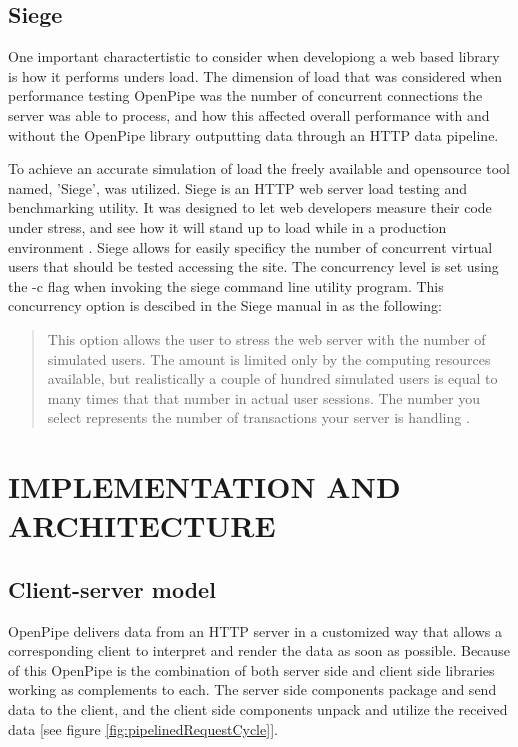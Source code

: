 \documentclass[12pt]{report}
\begin{document}
\section{Siege}
One important charactertistic to consider when developiong a web based library is how it performs unders load. The dimension of load that was considered when performance testing OpenPipe was the number of concurrent connections the server was able to process, and how this affected overall performance with and without the OpenPipe library outputting data through an HTTP data pipeline.

To achieve an accurate simulation of load the freely available and opensource tool named, 'Siege', was utilized. Siege is an HTTP web server load testing and benchmarking utility. It was designed to let web developers measure their code under stress, and see how it will stand up to load while in a production environment \cite{siegeHomepage}.  Siege allows for easily specificy the number of concurrent virtual users that should be tested accessing the site. The concurrency level is set using the -c flag when invoking the siege command line utility program. This concurrency option is descibed in the Siege manual in as the following:

\begin{quote}
This option allows the user to stress the web server with the number of simulated users. The amount is limited only by the computing resources available, but realistically a couple of hundred simulated users is equal to many times that that number in actual user sessions. The number you select represents the number of transactions your server is handling \cite{siegeManual}.
\end{quote}




\chapter{IMPLEMENTATION AND ARCHITECTURE}

\section{Client-server model}
OpenPipe delivers data from an HTTP server in a customized way that allows a corresponding client to interpret and render the data as soon as possible. Because of this OpenPipe is the combination of both server side and client side libraries working as complements to each. The server side components package and send data to the client, and the client side components unpack and utilize the received data [see figure \ref{fig:pipelinedRequestCycle}].
\end{document}
